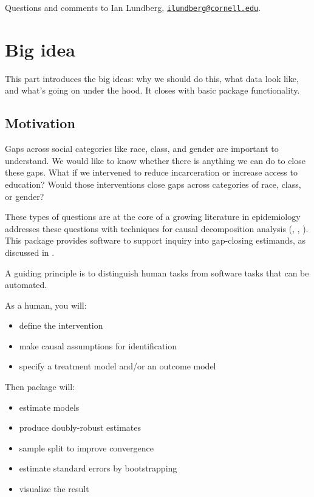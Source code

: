 \documentclass[
]{article}
\providecommand{\tightlist}{%
  \setlength{\itemsep}{0pt}\setlength{\parskip}{0pt}}
\begin{document}
Questions and comments to Ian Lundberg, \href{mailto:ilundberg@cornell.edu}{\nolinkurl{ilundberg@cornell.edu}}.

\hypertarget{big-idea}{%
\section{Big idea}\label{big-idea}}

This part introduces the big ideas: why we should do this, what data look like, and what's going on under the hood. It closes with basic package functionality.

\hypertarget{motivation}{%
\subsection{Motivation}\label{motivation}}

Gaps across social categories like race, class, and gender are important to understand. We would like to know whether there is anything we can do to close these gaps. What if we intervened to reduce incarceration or increase access to education? Would those interventions close gaps across categories of race, class, or gender?

These types of questions are at the core of a growing literature in epidemiology addresses these questions with techniques for causal decomposition analysis (\citet{vanderweele2014}, \citet{jackson2018}, \citet{jackson2020}). This package provides software to support inquiry into gap-closing estimands, as discussed in \citet{lundberg2021}.

A guiding principle is to distinguish human tasks from software tasks that can be automated.

As a human, you will:

\begin{itemize}
\tightlist
\item
  define the intervention
\item
  make causal assumptions for identification
\item
  specify a treatment model and/or an outcome model
\end{itemize}

Then package will:

\begin{itemize}
\tightlist
\item
  estimate models
\item
  produce doubly-robust estimates
\item
  sample split to improve convergence
\item
  estimate standard errors by bootstrapping
\item
  visualize the result
\end{itemize}
\end{document}
